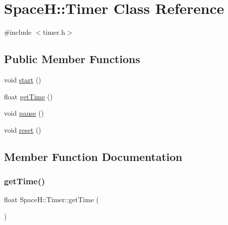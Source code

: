 \hypertarget{class_space_h_1_1_timer}{}\section{SpaceH\+:\+:Timer Class Reference}
\label{class_space_h_1_1_timer}


{\ttfamily \#include $<$timer.\+h$>$}

\subsection*{Public Member Functions}
\begin{DoxyCompactItemize}
\item 
void \mbox{\hyperlink{class_space_h_1_1_timer_a54e4e20698afb68d2054d5ebb40fc4b6}{start}} ()
\item 
float \mbox{\hyperlink{class_space_h_1_1_timer_a65e860a9cfce03262f641aab780c4555}{get\+Time}} ()
\item 
void \mbox{\hyperlink{class_space_h_1_1_timer_a5bcada7781d8fc8f858607d81d9730bd}{pause}} ()
\item 
void \mbox{\hyperlink{class_space_h_1_1_timer_a80e119ed1c08d10f36b725cfb85fd8c1}{reset}} ()
\end{DoxyCompactItemize}


\subsection{Member Function Documentation}
\mbox{\label{class_space_h_1_1_timer_a65e860a9cfce03262f641aab780c4555}} 
\subsubsection{\texorpdfstring{get\+Time()}{getTime()}}
{\footnotesize\ttfamily float Space\+H\+::\+Timer\+::get\+Time (\begin{DoxyParamCaption}{ }\end{DoxyParamCaption})\hspace{0.3cm}{\ttfamily [inline]}}

